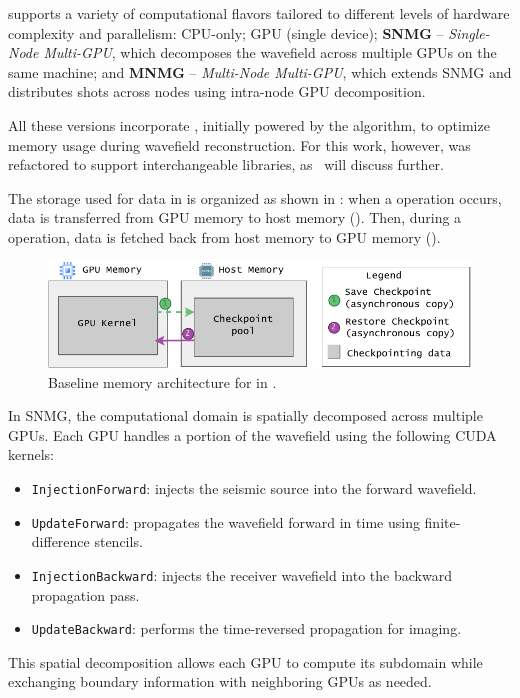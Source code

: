 \documentclass[Ingles]{ic-tese-v3}
\begin{document}
\awave supports a variety of computational flavors tailored to different levels of hardware complexity and parallelism: CPU-only; GPU (single device); \textbf{SNMG} – \textit{Single-Node Multi-GPU}, which decomposes the wavefield across multiple GPUs on the same machine; and \textbf{MNMG} – \textit{Multi-Node Multi-GPU}, which extends SNMG and distributes shots across nodes using intra-node GPU decomposition.

All these versions incorporate \checkpointing, initially powered by the \revolve algorithm, to optimize memory usage during wavefield reconstruction. For this work, however, \awave was refactored to support interchangeable \checkpointing libraries, as~ will discuss further.

The storage used for \checkpointing data in \awave is organized as shown in : when a \save {} operation occurs, data is transferred from GPU memory to host memory (\dth). Then, during a \restore {} operation, data is fetched back from host memory to GPU memory (\htd).

\begin{figure}[h!]
    \centering
    \includegraphics[width=1\linewidth,clip]{figures/arch_baseline.pdf}
    \caption[\awave baseline memory architecture diagram]{Baseline memory architecture for \checkpointing in \awave.}%
    \label{fig:baseline}
\end{figure}

In SNMG, the computational domain is spatially decomposed across multiple GPUs. Each GPU handles a portion of the wavefield using the following CUDA kernels:
\begin{itemize}
  \item \texttt{InjectionForward}: injects the seismic source into the forward wavefield.
  \item \texttt{UpdateForward}: propagates the wavefield forward in time using finite-difference stencils.
  \item \texttt{InjectionBackward}: injects the receiver wavefield into the backward propagation pass.
  \item \texttt{UpdateBackward}: performs the time-reversed propagation for imaging.
\end{itemize}
This spatial decomposition allows each GPU to compute its subdomain while exchanging boundary information with neighboring GPUs as needed.
\end{document}

